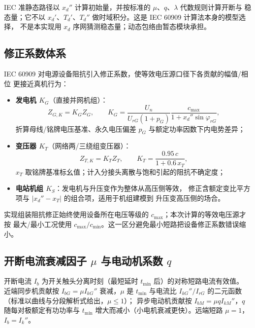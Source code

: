 \begin{theorynote}
IEC 准静态路径以 $x_d''$ 计算初始量，并按标准的 $\mu$、$q$、$\lambda$ 代数规则计算开断与
稳态量；它不以 $x_d'$、$T_d'$、$T_d''$ 做时域积分。这是 IEC 60909 计算法本身的模型选择，
不是本实现用 $x_d$ 序网猜测稳态量；动态包络由暂态模块承担。
\end{theorynote}

\subsection{修正系数体系}
IEC 60909 对电源设备阻抗引入修正系数，使等效电压源口径下各贡献的幅值/相位
更接近真机行为：
\begin{itemize}
  \item \textbf{发电机 $K_G$}（直接并网机组）：
        \begin{equation}
        Z_{G,K}=K_G Z_G,\qquad
        K_G=\frac{U_n}{U_{rG}(1+p_G)}
            \frac{c_{\max}}{1+x_d''\sin\varphi_{rG}},
        \end{equation}
        折算母线/铭牌电压基准、永久电压偏差 $p_G$ 与额定功率因数下内电势差异；
  \item \textbf{变压器 $K_T$}（网络两/三绕组变压器）：
        \begin{equation}
        Z_{T,K}=K_T Z_T,\qquad K_T=\frac{0.95\,c}{1+0.6\,x_T},
        \end{equation}
        $x_T$ 取铭牌基准标幺值；计入分接头离散与饱和引起的阻抗不确定度；
  \item \textbf{电站机组 $K_S$}：发电机与升压变作为整体从高压侧等效，
        修正含额定变比平方项与 $|x_d''-x_T|$ 的组合项，适用于机组建模到
        升压变高压侧的场合。
\end{itemize}
实现组装阻抗修正始终使用设备所在电压等级的 $c_{\max}$；本次计算的等效电压源才按
最大/最小工况使用 $c_{\max}/c_{\min}$。这一区分避免最小短路把设备修正系数错误缩小。

\subsection{开断电流衰减因子 \texorpdfstring{$\mu$}{μ} 与电动机系数 \texorpdfstring{$q$}{q}}
\begin{definition}[对称开断电流与 $\mu$、$q$]
开断电流 $I_b$ 为开关触头分离时刻（最短延时 $t_{\min}$ 后）的对称短路电流有效值。
近端同步机贡献按 $I_{bG}=\mu I_{kG}''$ 衰减，$\mu$ 是 $t_{\min}$ 与电流比
$I_{kG}''/I_{rG}$ 的二元函数（标准以曲线与分段解析式给出，$\mu\le1$）；
异步电动机贡献按 $I_{bM}=\mu q I_{kM}''$，$q$ 随每对极额定有功功率与 $t_{\min}$
增大而减小（小电机衰减更快）。远端短路 $\mu=1$，$I_b=I_k''$。
\end{definition}

